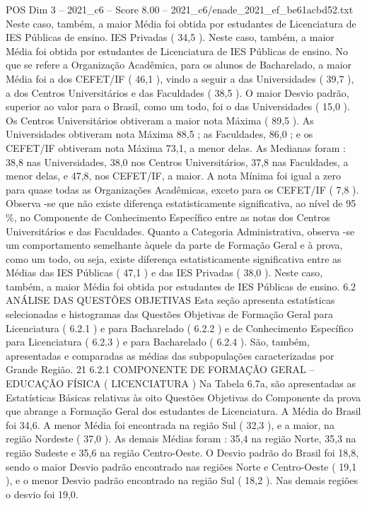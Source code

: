 \begin{textsample}{POS Dim 3 – 2021\_c6 – Score 8.00 – 2021\_c6/enade\_2021\_ef\_be61acbd52.txt}
Neste caso, também, a maior Média foi obtida por estudantes de Licenciatura de IES Públicas de ensino.
IES Privadas ( 34,5 ).
Neste caso, também, a maior Média foi obtida por estudantes de Licenciatura de IES Públicas de ensino.
No que se refere a Organização Acadêmica, para os alunos de Bacharelado, a maior Média foi a dos CEFET/IF ( 46,1 ), vindo a seguir a das Universidades ( 39,7 ), a dos Centros Universitários e das Faculdades ( 38,5 ).
O maior Desvio padrão, superior ao valor para o Brasil, como um todo, foi o das Universidades ( 15,0 ).
Os Centros Universitários obtiveram a maior nota Máxima ( 89,5 ).
As Universidades obtiveram nota Máxima 88,5 ; as Faculdades, 86,0 ; e os CEFET/IF obtiveram nota Máxima 73,1, a menor delas.
As Medianas foram : 38,8 nas Universidades, 38,0 nos Centros Universitários, 37,8 nas Faculdades, a menor delas, e 47,8, nos CEFET/IF, a maior.
A nota Mínima foi igual a zero para quase todas as Organizações Acadêmicas, exceto para os CEFET/IF ( 7,8 ).
Observa -se que não existe diferença estatisticamente significativa, ao nível de 95 \%, no Componente de Conhecimento Específico entre as notas dos Centros Universitários e das Faculdades.
Quanto a Categoria Administrativa, observa -se um comportamento semelhante àquele da parte de Formação Geral e à prova, como um todo, ou seja, existe diferença estatisticamente significativa entre as Médias das IES Públicas ( 47,1 ) e das IES Privadas ( 38,0 ).
Neste caso, também, a maior Média foi obtida por estudantes de IES Públicas de ensino. 6.2 ANÁLISE DAS QUESTÕES OBJETIVAS Esta seção apresenta estatísticas selecionadas e histogramas das Questões Objetivas de Formação Geral para Licenciatura ( 6.2.1 ) e para Bacharelado ( 6.2.2 ) e de Conhecimento Específico para Licenciatura ( 6.2.3 ) e para Bacharelado ( 6.2.4 ).
São, também, apresentadas e comparadas as médias das subpopulações caracterizadas por Grande Região. 21 6.2.1 COMPONENTE DE FORMAÇÃO GERAL – EDUCAÇÃO FÍSICA ( LICENCIATURA ) Na Tabela 6.7a, são apresentadas as Estatísticas Básicas relativas às oito Questões Objetivas do Componente da prova que abrange a Formação Geral dos estudantes de Licenciatura.
A Média do Brasil foi 34,6.
A menor Média foi encontrada na região Sul ( 32,3 ), e a maior, na região Nordeste ( 37,0 ).
As demais Médias foram : 35,4 na região Norte, 35,3 na região Sudeste e 35,6 na região Centro-Oeste.
O Desvio padrão do Brasil foi 18,8, sendo o maior Desvio padrão encontrado nas regiões Norte e Centro-Oeste ( 19,1 ), e o menor Desvio padrão encontrado na região Sul ( 18,2 ).
Nas demais regiões o desvio foi 19,0.

\end{textsample}

